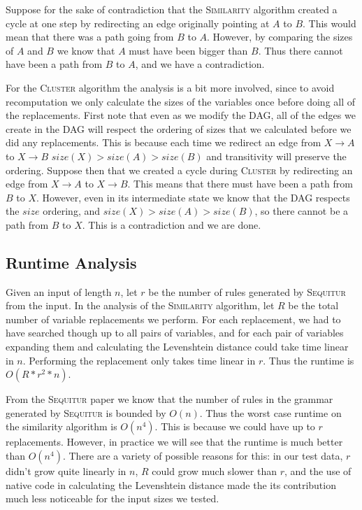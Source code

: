\documentclass[11pt]{article}
\newcommand{\Sequitur}{\textsc{Sequitur}\xspace}
\newcommand{\Similarity}{\textsc{Similarity}\xspace}
\newcommand{\Cluster}{\textsc{Cluster}\xspace}
\begin{document}
Suppose for the sake of contradiction that the \Similarity algorithm created a
cycle at one step by redirecting an edge originally pointing at $A$ to $B$.
This would mean that there was a path going from $B$ to $A$. However, by
comparing the sizes of $A$ and $B$ we know that $A$ must have been bigger than
$B$. Thus there cannot have been a path from $B$ to $A$, and we have a
contradiction.

For the \Cluster algorithm the analysis is a bit more involved, since to avoid
recomputation we only calculate the sizes of the variables once before doing
all of the replacements. First note that even as we modify the DAG, all of the
edges we create in the DAG will respect the ordering of sizes that we
calculated before we did any replacements. This is because each time we
redirect an edge from $X\rightarrow A$ to $X\rightarrow B$
$size(X)>size(A)>size(B)$ and transitivity will preserve the ordering.  Suppose
then that we created a cycle during \Cluster by redirecting an edge from $X
\rightarrow A$ to $X \rightarrow B$.  This means that there must have been a
path from $B$ to $X$. However, even in its intermediate state we know that the
DAG respects the $size$ ordering, and $size(X) > size(A) > size(B)$, so there
cannot be a path from $B$ to $X$. This is a contradiction and we are done.

\subsection{Runtime Analysis}

Given an input of length $n$, let $r$ be the number of rules generated by
\Sequitur from the input.  In the analysis of the \Similarity algorithm, let $R$
be the total number of variable replacements we perform. For each replacement,
we had to have searched though up to all pairs of variables, and for each pair
of variables expanding them and calculating the Levenshtein distance could take
time linear in $n$.  Performing the replacement only takes time linear in $r$.
Thus the runtime is $\boxed{O(R*r^2*n)}$.

From the \Sequitur paper \cite{sequitur} we know that the number of rules in
the grammar generated by \Sequitur is bounded by $O(n)$. Thus the worst
case runtime on the similarity algorithm is $\boxed{O(n^4)}$. This is because
we could have up to $r$ replacements.  However, in practice we will see that
the runtime is much better than $O(n^4)$. There are a variety of possible
reasons for this: in our test data, $r$ didn't grow quite linearly in $n$, $R$
could grow much slower than $r$, and the use of native code in calculating the
Levenshtein distance made the its contribution much less noticeable for the
input sizes we tested.
\end{document}
